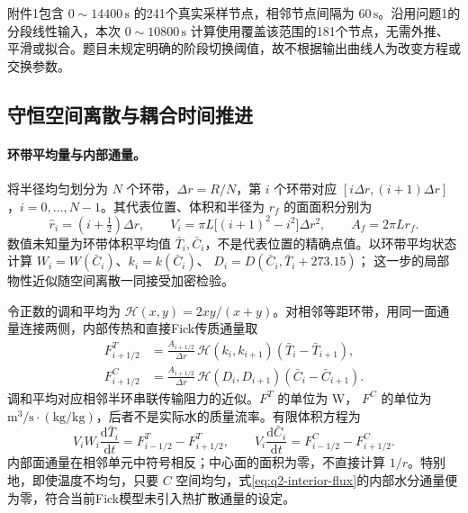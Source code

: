 附件1包含 \(0\sim14400\,\mathrm s\) 的241个真实采样节点，相邻节点间隔为 \(60\,\mathrm s\)。沿用问题1的分段线性输入，本次 \(0\sim10800\,\mathrm s\) 计算使用覆盖该范围的181个节点，无需外推、平滑或拟合。题目未规定明确的阶段切换阈值，故不根据输出曲线人为改变方程或交换参数。

\subsection{守恒空间离散与耦合时间推进}

\paragraph{环带平均量与内部通量。}
将半径均匀划分为 \(N\) 个环带，\(\Delta r=R/N\)，第 \(i\) 个环带对应
\([i\Delta r,(i+1)\Delta r]\)，\(i=0,\ldots,N-1\)。其代表位置、体积和半径为 \(r_f\) 的面面积分别为
\begin{equation}
\widehat r_i=(i+\tfrac12)\Delta r,\qquad
V_i=\pi L\bigl[(i+1)^2-i^2\bigr]\Delta r^2,\qquad
A_f=2\pi Lr_f .
\label{eq:q2-geometry}
\end{equation}
数值未知量为环带体积平均值 \(\bar T_i,\bar C_i\)，不是代表位置的精确点值。以环带平均状态计算
\(W_i=W(\bar C_i)\)、\(k_i=k(\bar C_i)\)、
\(D_i=D(\bar C_i,\bar T_i+273.15)\)；
这一步的局部物性近似随空间离散一同接受加密检验。

令正数的调和平均为 \(\mathcal H(x,y)=2xy/(x+y)\)。对相邻等距环带，用同一面通量连接两侧，内部传热和直接Fick传质通量取
\begin{equation}
\begin{aligned}
F^T_{i+1/2}
&=\frac{A_{i+1/2}}{\Delta r}\,
 \mathcal H(k_i,k_{i+1})(\bar T_i-\bar T_{i+1}),\\
F^C_{i+1/2}
&=\frac{A_{i+1/2}}{\Delta r}\,
 \mathcal H(D_i,D_{i+1})(\bar C_i-\bar C_{i+1}).
\end{aligned}
\label{eq:q2-interior-flux}
\end{equation}
调和平均对应相邻半环串联传输阻力的近似。\(F^T\) 的单位为 W，
\(F^C\) 的单位为 \(\mathrm{m^3/s}\cdot(\mathrm{kg/kg})\)，后者不是实际水的质量流率。有限体积方程为
\begin{equation}
V_iW_i\frac{\mathrm d\bar T_i}{\mathrm dt}
=F^T_{i-1/2}-F^T_{i+1/2},\qquad
V_i\frac{\mathrm d\bar C_i}{\mathrm dt}
=F^C_{i-1/2}-F^C_{i+1/2}.
\label{eq:q2-fv}
\end{equation}
内部面通量在相邻单元中符号相反；中心面的面积为零，不直接计算 \(1/r\)。特别地，即使温度不均匀，只要 \(C\) 空间均匀，式\eqref{eq:q2-interior-flux}的内部水分通量便为零，符合当前Fick模型未引入热扩散通量的设定。

